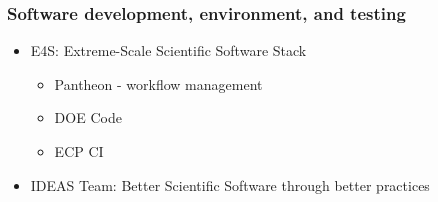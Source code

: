 \def\CC{{C\nolinebreak[4]\hspace{-.05em}\raisebox{.4ex}{\tiny\bf ++}}}


\begin{frame}\frametitle{Software development, environment, and testing}
\begin{itemize}
\item E4S: Extreme-Scale Scientific Software Stack %
\begin{itemize}
\item Pantheon - workflow management
\item DOE Code
\item ECP CI
\end{itemize}
\item IDEAS Team: Better Scientific Software through better practices
\end{itemize}
\end{frame}

